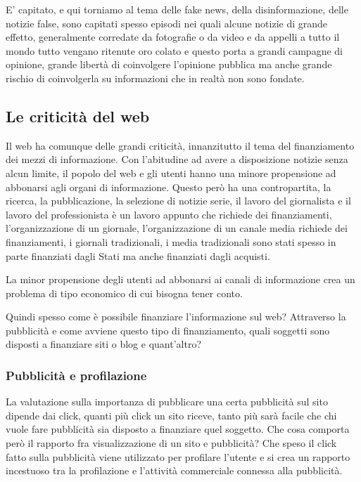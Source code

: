E' capitato, e qui torniamo al tema delle fake news, della disinformazione, delle notizie false, sono capitati spesso episodi nei quali alcune notizie di grande effetto, generalmente corredate da fotografie o da video e da appelli a tutto il mondo tutto vengano ritenute oro colato e questo porta a grandi campagne di opinione, grande libertà di coinvolgere l'opinione pubblica ma anche grande rischio di coinvolgerla su informazioni che in realtà non sono fondate. 

\subsection{Le criticità del web}
Il web ha comunque delle grandi criticità, innanzitutto il tema del finanziamento dei mezzi di informazione. 
Con l'abitudine ad avere a disposizione notizie senza alcun limite, il popolo del web e gli utenti hanno una minore propensione ad abbonarsi agli organi di informazione. Questo però ha una contropartita, la ricerca, la pubblicazione, la selezione di notizie serie, il lavoro del giornalista e il lavoro del professionista è un lavoro appunto che richiede dei finanziamenti, l'organizzazione di un giornale, l'organizzazione di un canale media richiede dei finanziamenti, i giornali tradizionali, i media tradizionali sono stati spesso in parte finanziati dagli Stati ma anche finanziati dagli acquisti.\par
La minor propensione degli utenti ad abbonarsi ai canali di informazione crea un problema di tipo economico di cui bisogna tener conto. \par
Quindi spesso come è possibile finanziare l'informazione sul web? Attraverso la pubblicità e come avviene questo tipo di finanziamento, quali soggetti sono disposti a finanziare siti o blog e quant'altro? 
\subsubsection{Pubblicità e profilazione}
La valutazione sulla importanza di pubblicare una certa pubblicità sul sito dipende dai click, quanti più click un sito riceve, tanto più sarà facile che chi vuole fare pubblicità sia disposto a finanziare quel soggetto. 
Che cosa comporta però il rapporto fra visualizzazione di un sito e pubblicità? Che speso il click fatto sulla pubblicità viene utilizzato per profilare l'utente e si crea un rapporto incestuoso tra la profilazione e l'attività commerciale connessa alla pubblicità. 
